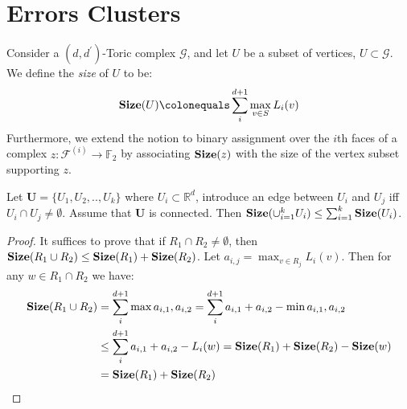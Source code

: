 

\section{Errors Clusters}

\begin{definition}
Consider a $(d,d^{\prime})$-Toric complex $\mathcal{G}$, and let $U$ be a subset of vertices, $U \subset \mathcal{G}$. We define the \textit{size} of $U$ to be:
  \begin{equation*}
    \begin{split}
      \Size{U} \colonequals \sum_{i}^{d+1} \max_{v \in S} L_{i}(v) 
    \end{split}
  \end{equation*}
Furthermore, we extend the notion to binary assignment over the $i$th faces of a complex $z : \mathcal{F}^{(i)} \rightarrow \mathbb{F}_{2}$ by associating $\mathbf{Size}(z)$ with the size of the vertex subset supporting $z$.
\end{definition}

  \begin{claim}
    Let $\mathbf{U} = \{ U_{1}, U_{2} , .. , U_{k} \}$ where $U_{i} \subset \mathbb{R}^{d}$, introduce an edge between $U_{i}$ and $U_{j}$ iff $U_{i} \cap U_{j} \neq \emptyset$. Assume that $\mathbf{U}$ is connected. Then $\mathbf{Size}(\cup^{k}_{i=1} U_{i}) \le \sum^{k}_{i=1}{\mathbf{Size}(U_{i})}$. 
  \end{claim}
  \begin{proof}
    It suffices to prove that if $R_{1} \cap R_{2} \neq \emptyset$, then $\mathbf{Size}(R_{1} \cup R_{2}) \le \mathbf{Size}(R_{1}) + \mathbf{Size}(R_{2})$. Let $a_{i,j} = \max_{v \in R_{j}}L_{i}(v)$. Then for any $w \in R_{1}\cap R_{2}$ we have:  
    \begin{equation*}
      \begin{split}
        \mathbf{Size}(R_{1} \cup R_{2}) &= \sum_{i}^{d+1}{\max{ a_{i,1},a_{i,2} } } =  \sum_{i}^{d+1}{a_{i,1} + a_{i,2} - \min{ a_{i,1},a_{i,2} } } \\
        & \le   \sum_{i}^{d+1}{a_{i,1} + a_{i,2} - L_{i}(w) } = \mathbf{Size}(R_{1}) + \mathbf{Size}(R_{2}) - \mathbf{Size}(w)  \\
        &  = \mathbf{Size}(R_{1}) + \mathbf{Size}(R_{2}) 
      \end{split}
    \end{equation*}
  \end{proof}

